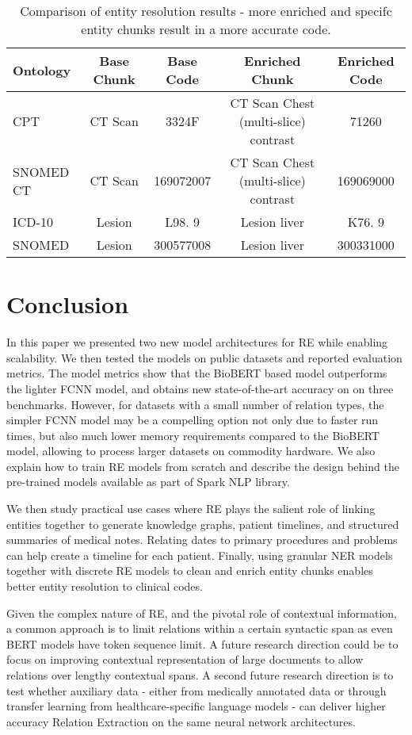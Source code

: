 \documentclass[letterpaper]{article}
\begin{document}
\begin{table*}
\centering
\begin{tabular}{ lcccc}
\toprule
\textbf{Ontology} & \textbf{Base Chunk} & \textbf{Base Code} & \textbf{Enriched Chunk} & \textbf{Enriched Code}\\
\midrule
CPT & CT Scan & 3324F & CT Scan Chest (multi-slice) contrast  & 71260 \\
SNOMED CT & CT Scan & 169072007 & CT Scan Chest (multi-slice) contrast  & 169069000 \\
ICD-10 & Lesion & L98. 9   & Lesion liver & K76. 9\\
SNOMED & Lesion & 300577008   & Lesion liver & 300331000\\
\bottomrule
\end{tabular}
\caption{Comparison of entity resolution results - more enriched and specifc entity chunks result in a more accurate code.}
\label{tab:resolver_comp}
\end{table*}

\section{Conclusion}

In this paper we presented two new model architectures for RE while enabling scalability. We then tested the models on public datasets and reported evaluation metrics. The model metrics show that the BioBERT based model outperforms the lighter FCNN model, and obtains new state-of-the-art accuracy on on three benchmarks. However, for datasets with a small number of relation types, the simpler FCNN model may be a compelling option not only due to faster run times, but also much lower memory requirements compared to the BioBERT model, allowing to process larger datasets on commodity hardware. We also explain how to train RE models from scratch and describe the design behind the pre-trained models available as part of Spark NLP library.

We then study practical use cases where RE plays the salient role of linking entities together to generate knowledge graphs, patient timelines, and structured summaries of medical notes. Relating dates to primary procedures and problems can help create a timeline for each patient. Finally, using granular NER models together with discrete RE models to clean and enrich entity chunks enables better entity resolution to clinical codes.

Given the complex nature of RE, and the pivotal role of contextual information, a common approach is to limit relations within a certain syntactic span as even BERT models have token sequence limit. A future research direction could be to focus on improving contextual representation of large documents to allow relations over lengthy contextual spans. A second future research direction is to test whether auxiliary data - either from medically annotated data or through transfer learning from healthcare-specific language models - can deliver higher accuracy Relation Extraction on the same neural network architectures.
\end{document}
